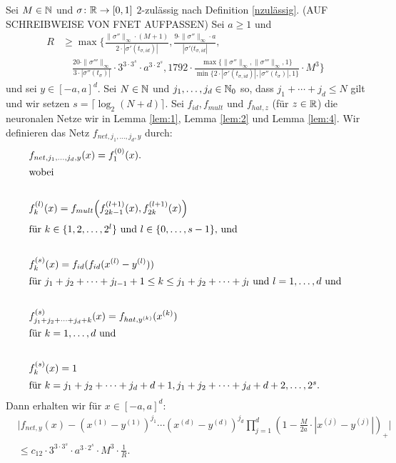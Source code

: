 \begin{lem}
\label{lem:5}
Sei $M \in \mathbb{N}$ und $\sigma\colon \mathbb{R} \to [0, 1]$ $2$-zulässig nach Definition \ref{nzulässig}. (AUF SCHREIBWEISE VON FNET AUFPASSEN)
Sei $a \geq 1$ und 
\begin{equation*}
\begin{split}
R & \geq \max\biggl\{\frac{\|\sigma''\|_{\infty} \cdot (M + 1)}{2 \cdot |\sigma'(t_{\sigma, id})|}, \frac{9 \cdot \|\sigma''\|_{\infty} \cdot a}{|\sigma'(t_{\sigma, id}|}, \\
& \quad \frac{20 \cdot \|\sigma'''\|_{\infty}}{3 \cdot |\sigma''(t_{\sigma})|} \cdot 3^{3 \cdot 3^s} \cdot a^{3 \cdot 2^s}, 1792 \cdot \frac{\max\{\|\sigma''\|_{\infty},\|\sigma'''\|_{\infty}, 1\}}{\min\{2 \cdot |\sigma'(t_{\sigma, id})|, |\sigma''(t_{\sigma})|, 1\}} \cdot M^3 \biggr\}
\end{split}
\end{equation*}
und sei $y \in [-a, a]^d.$ Sei $N \in \mathbb{N}$ und $j_1,\dots,j_d \in \mathbb{N}_0$ so, dass $j_1 + \cdots + j_d \leq N$ gilt und wir setzen $s = \lceil\log_2(N + d)\rceil$. Sei $f_{id}, f_{mult}$ und $f_{hat, z}$ (für $z \in \mathbb{R}$) die neuronalen Netze wir in Lemma \ref{lem:1}, Lemma \ref{lem:2} und Lemma \ref{lem:4}. Wir definieren das Netz $f_{net,j_1,\dots,j_d,y}$ durch:
\begin{align*}
\label{fnet}
& f_{net,j_1,\dots,j_d,y}(x) = f_1^{(0)}(x). \\
\intertext{wobei} \\
& f_k^{(l)}(x) = f_{mult}\Big(f_{2k - 1}^{(l + 1)}(x),f_{2k}^{(l + 1)}(x)\Big) \\
\intertext{für $k \in \{1, 2, \dots, 2^l \}$ und $l \in\{0,\dots,s - 1\}, $ und} \\
& f_k^{(s)}(x) = f_{id}(f_{id}(x^{(l)} - y^{(l)}))  \\
\intertext{für $j_1 + j_2 + \dots + j_{l-1} + 1 \leq k \leq j_1 + j_2 + \dots + j_l$ und $l = 1,\dots,d$ und} \\ 
& f_{j_1 + j_2 + \dots + j_d + k}^{(s)}(x) = f_{hat,y^{(k)}}(x^{(k)}) \\
\intertext{für $k = 1,\dots,d$ und} \\
& f_k^{(s)}(x) = 1 \\
\intertext{für $k = j_1 + j_2 + \dots + j_d + d + 1,j_1 + j_2 + \dots + j_d + d + 2,\dots,2^s.$}
\end{align*} 
Dann erhalten wir für $x \in [-a, a]^d$:
\begin{equation*}
\begin{split}
& \bigg|f_{net, y}(x) - (x^{(1)} - y^{(1)})^{j_1} \cdots (x^{(d)} - y^{(d)})^{j_d} \prod_{j = 1}^d (1 - \frac{M}{2a} \cdot |x^{(j)} - y^{(j)}|)_+\bigg| \\
& \leq c_{12} \cdot 3^{3 \cdot 3^s} \cdot a^{3 \cdot 2^s} \cdot M^3 \cdot \frac{1}{R}.
\end{split}
\end{equation*}
\end{lem}
